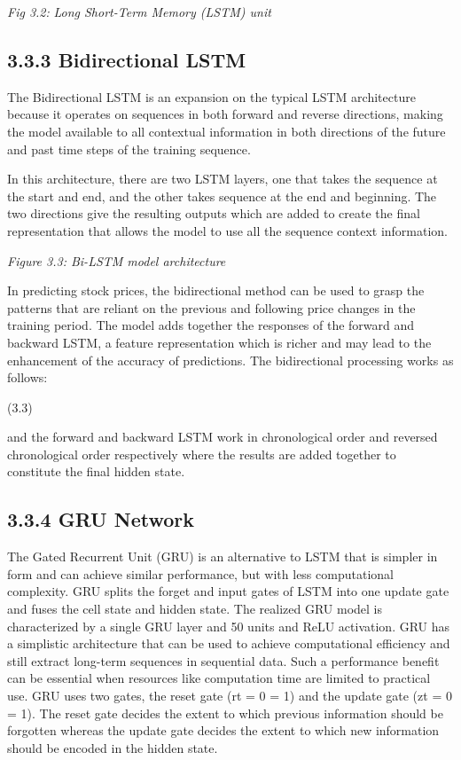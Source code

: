 \documentclass[12pt,a4paper]{report}
\begin{document}
\begin{center}
\textit{Fig 3.}\textit{2}\textit{: }\textit{Long Short-Term Memory (LSTM) unit}
\end{center}
\subsection{3.3.3 Bidirectional LSTM}
The Bidirectional LSTM is an expansion on the typical LSTM architecture because it operates on sequences in both forward and reverse directions, making the model available to all contextual information in both directions of the future and past time steps of the training sequence.

In this architecture, there are two LSTM layers, one that takes the sequence at the start and end, and the other takes sequence at the end and beginning. The two directions give the resulting outputs which are added to create the final representation that allows the model to use all the sequence context information.

\begin{center}
\textit{Figure 3.}\textit{3}\textit{: Bi-LSTM model architecture}
\end{center}
In predicting stock prices, the bidirectional method can be used to grasp the patterns that are reliant on the previous and following price changes in the training period. The model adds together the responses of the forward and backward LSTM, a feature representation which is richer and may lead to the enhancement of the accuracy of predictions. The bidirectional processing works as follows:

											(3.3)

and the forward and backward LSTM work in chronological order and reversed chronological order respectively where the results are added together to constitute the final hidden state.

\subsection{3.3.4 GRU Network}
The Gated Recurrent Unit (GRU) is an alternative to LSTM that is simpler in form and can achieve similar performance, but with less computational complexity. GRU splits the forget and input gates of LSTM into one update gate and fuses the cell state and hidden state. The realized GRU model is characterized by a single GRU layer and 50 units and ReLU activation. GRU has a simplistic architecture that can be used to achieve computational efficiency and still extract long-term sequences in sequential data. Such a performance benefit can be essential when resources like computation time are limited to practical use. GRU uses two gates, the reset gate (rt = 0 = 1) and the update gate (zt = 0 = 1). The reset gate decides the extent to which previous information should be forgotten whereas the update gate decides the extent to which new information should be encoded in the hidden state.
\end{document}
